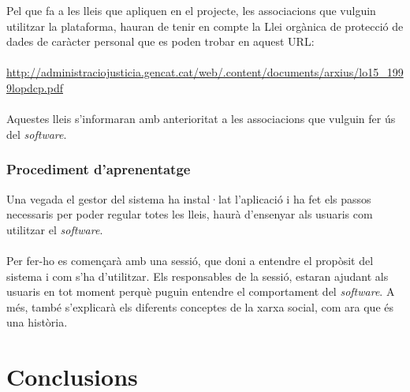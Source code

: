 \documentclass[11pt,catalan,listoffigures,listoftables]{tfgetsinf}
\begin{document}
Pel que fa a les lleis que apliquen en el projecte, les associacions que vulguin utilitzar la plataforma, hauran de tenir en compte la Llei orgànica de protecció de dades de caràcter personal que es poden trobar en aquest URL:\\ \\
\url{http://administraciojusticia.gencat.cat/web/.content/documents/arxius/lo15_1999lopdcp.pdf}\\ \\
Aquestes lleis s'informaran amb anterioritat a les associacions que vulguin fer ús del \textit{software}.

\subsection{Procediment d'aprenentatge}

Una vegada el gestor del sistema ha instal·lat l'aplicació i ha fet els passos necessaris per poder regular totes les lleis, haurà d'ensenyar als usuaris com utilitzar el \textit{software}.\\ \\
Per fer-ho es començarà amb una sessió, que doni a entendre el propòsit del sistema i com s'ha d'utilitzar. Els responsables de la sessió, estaran ajudant als usuaris en tot moment perquè puguin entendre el comportament del \textit{software}. A més, també s'explicarà els diferents conceptes de la xarxa social, com ara que és una història.

\chapter{Conclusions}
\end{document}
